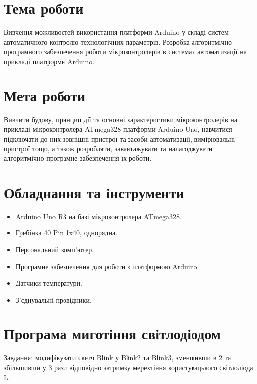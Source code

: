 \documentclass[a4paper]{article}
\begin{document}
\section*{Тема роботи}
Вивчення можливостей використання платформи Arduino у складі систем автоматичного контролю технологічних параметрів. Розробка алгоритмічно-програмного забезпечення роботи мікроконтролерів в системах автоматизації на прикладі платформи Arduino.

\section*{Мета роботи}
Вивчити будову, принцип дії та основні характеристики мікроконтролерів на прикладі мікроконтролера ATmega328 платформи Arduino Uno, навчитися підключати до них зовнішні пристрої та засоби автоматизації, вимірювальні пристрої тощо, а також розробляти, завантажувати та налагоджувати алгоритмічно-програмне забезпечення їх роботи.


\section*{Обладнання та інструменти}
\begin{itemize} 
    \item Arduino Uno R3 на базі мікроконтролера ATmega328.
    \item Гребінка 40 Pin 1x40, однорядна.
    \item Персональний комп’ютер.
    \item Програмне забезпечення для роботи з платформою Arduino.
    \item Датчики температури.
    \item З’єднувальні провідники.
\end{itemize}

\newpage

\section*{Програма миготіння світлодіодом}

Завдання: модифікувати скетч Blink у Blink2 та
Blink3, зменшивши в 2 та збільшивши у 3 рази відповідно
затримку мерехтіння користувацького світлоліода L.
\end{document}
